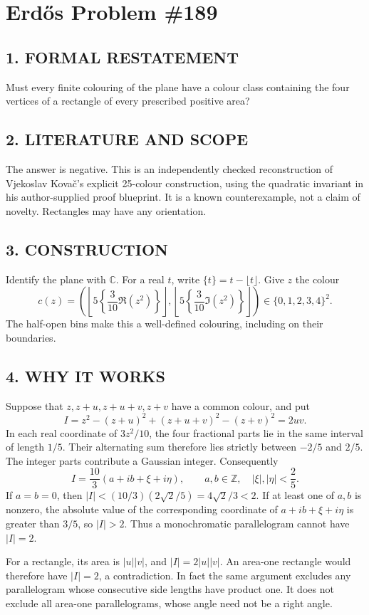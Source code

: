 \section{Erd\H{o}s Problem \#189}
\subsection*{1. FORMAL RESTATEMENT}
Must every finite colouring of the plane have a colour class containing the four vertices of a rectangle of every prescribed positive area?
\subsection*{2. LITERATURE AND SCOPE}
The answer is negative. This is an independently checked reconstruction of Vjekoslav Kova\v{c}'s explicit 25-colour construction, using the quadratic invariant in his author-supplied proof blueprint. It is a known counterexample, not a claim of novelty. Rectangles may have any orientation.
\subsection*{3. CONSTRUCTION}
Identify the plane with $\mathbb C$. For a real $t$, write $\{t\}=t-\lfloor t\rfloor$. Give $z$ the colour
\[
 c(z)=\left(\left\lfloor5\left\{\frac3{10}\Re(z^2)\right\}\right\rfloor,
 \left\lfloor5\left\{\frac3{10}\Im(z^2)\right\}\right\rfloor\right)\in\{0,1,2,3,4\}^2.
\]
The half-open bins make this a well-defined colouring, including on their boundaries.
\subsection*{4. WHY IT WORKS}
Suppose that $z,z+u,z+u+v,z+v$ have a common colour, and put
\[
 I=z^2-(z+u)^2+(z+u+v)^2-(z+v)^2=2uv.
\]
In each real coordinate of $3z^2/10$, the four fractional parts lie in the same interval of length $1/5$. Their alternating sum therefore lies strictly between $-2/5$ and $2/5$. The integer parts contribute a Gaussian integer. Consequently
\[
 I=\frac{10}{3}(a+ib+\xi+i\eta),\qquad
 a,b\in\mathbb Z,\quad |\xi|,|\eta|<\frac25.
\]
If $a=b=0$, then $|I|<(10/3)(2\sqrt2/5)=4\sqrt2/3<2$.
If at least one of $a,b$ is nonzero, the absolute value of the corresponding coordinate of $a+ib+\xi+i\eta$ is greater than $3/5$, so $|I|>2$. Thus a monochromatic parallelogram cannot have $|I|=2$.

For a rectangle, its area is $|u||v|$, and $|I|=2|u||v|$. An area-one rectangle would therefore have $|I|=2$, a contradiction. In fact the same argument excludes any parallelogram whose consecutive side lengths have product one. It does not exclude all area-one parallelograms, whose angle need not be a right angle.

